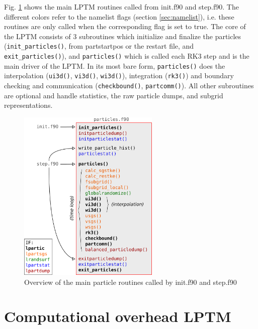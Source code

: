 \documentclass[twoside,a4paper]{report}
\begin{document}
Fig. \ref{fig:routines_modparticles} shows the main LPTM routines called from init.f90 and step.f90. The different colors refer to the namelist flags (section \ref{sec:namelist}), i.e. these routines are only called when the corresponding flag is set to true. The core of the LPTM consists of 3 subroutines which initialize and finalize the particles (\texttt{init\_particles()}, from partstartpos or the restart file, and \texttt{exit\_particles()}), and \texttt{particles()} which is called each RK3 step and is the main driver of the LPTM. In its most bare form, \texttt{particles()} does the interpolation (\texttt{ui3d()}, \texttt{vi3d()}, \texttt{wi3d()}), integration (\texttt{rk3()}) and boundary checking and communication (\texttt{checkbound()}, \texttt{partcomm()}). All other subroutines are optional and handle statistics, the raw particle dumps, and subgrid representations.

\begin{figure}[h]
  \begin{center}
    \includegraphics[width=0.6\textwidth]{figures_LPTM/routines.pdf}
    \caption{Overview of the main particle routines called by init.f90 and step.f90}
    \label{fig:routines_modparticles}       %
  \end{center}
\end{figure}

\section{Computational overhead LPTM}
\label{sec:overhead}
\end{document}
